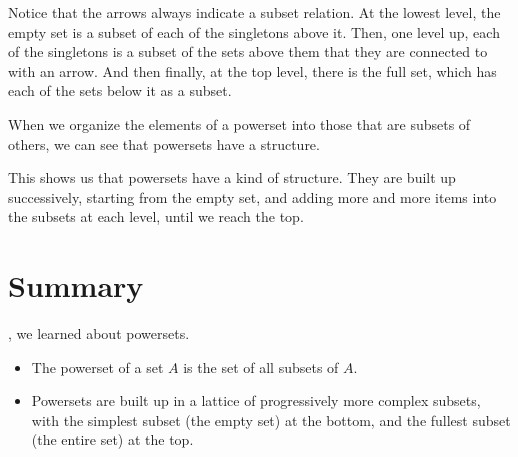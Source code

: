\documentclass[../../../main.tex]{subfiles}
\begin{document}
Notice that the arrows always indicate a subset relation. At the lowest level, the empty set is a subset of each of the singletons above it. Then, one level up, each of the singletons is a subset of the sets above them that they are connected to with an arrow. And then finally, at the top level, there is the full set, which has each of the sets below it as a subset.

\begin{aside}
  \begin{remark}
    When we organize the elements of a powerset into those that are subsets of others, we can see that powersets have a  structure.
  \end{remark}
\end{aside}

This shows us that powersets have a kind of  structure. They are built up successively, starting from the empty set, and adding more and more items into the subsets at each level, until we reach the top.


\section{Summary}

, we learned about powersets.

\begin{itemize}
  \item The powerset of a set $A$ is the set of all subsets of $A$.
  \item Powersets are built up in a lattice of progressively more complex subsets, with the simplest subset (the empty set) at the bottom, and the fullest subset (the entire set) at the top.
\end{itemize}
\end{document}

